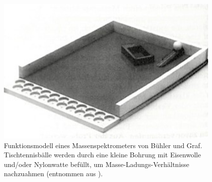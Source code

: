 \begin{figure}[htbp]
\centering
 \includegraphics[width=0.99\textwidth]{images/graf.jpg}
  \caption[Funktionsmodell eines Massenspektrometers von Bühler und Graf]{Funktionsmodell eines Massenspektrometers von Bühler und Graf. Tischtennisbälle werden durch eine kleine Bohrung mit Eisenwolle und/oder Nylonwatte befüllt, um Masse-Ladungs-Verhältnisse nachzuahmen (entnommen aus \cite[S\,34]{Graf2002}).}
  \label{fig:graf}
  \vspace{-0pt}
\end{figure}